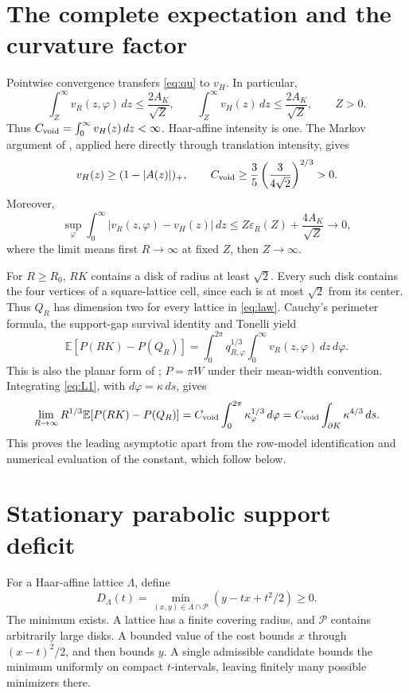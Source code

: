 \documentclass[11pt,a4paper]{article}
\newcommand{\E}{\mathbb E}\newcommand{\Prob}{\mathbb P}
\newcommand{\Pcal}{\mathcal P}\newcommand{\Hrow}{\mathcal H}
\theoremstyle{remark}\newtheorem{remark}{Remark}
\numberwithin{equation}{section}
\begin{document}
\section{The complete expectation and the curvature factor}\label{sec:expectation}
Pointwise convergence transfers \eqref{eq:qu} to $v_H$. In particular,
\begin{equation}\label{eq:tails}
 \int_Z^\infty v_R(z,\varphi)\,dz\le\frac{2A_K}{\sqrt Z},\qquad
 \int_Z^\infty v_H(z)\,dz\le\frac{2A_K}{\sqrt Z},\qquad Z>0.
\end{equation}
Thus $C_{\mathrm{void}}=\int_0^\infty v_H(z)\,dz<\infty$. Haar-affine intensity is one. The Markov argument of \cite[Lemma~3.3]{NR}, applied here directly through translation intensity, gives
\begin{equation}\label{eq:positive}
 v_H(z)\ge(1-|A(z)|)_+,\qquad
 C_{\mathrm{void}}\ge\frac35\left(\frac3{4\sqrt2}\right)^{2/3}>0.
\end{equation}
Moreover,
\begin{equation}\label{eq:L1}
 \sup_\varphi\int_0^\infty|v_R(z,\varphi)-v_H(z)|\,dz
 \le Z\varepsilon_R(Z)+\frac{4A_K}{\sqrt Z}\longrightarrow0,
\end{equation}
where the limit means first $R\to\infty$ at fixed $Z$, then $Z\to\infty$.

For $R\ge R_0$, $RK$ contains a disk of radius at least $\sqrt2$. Every such disk contains the four vertices of a square-lattice cell, since each is at most $\sqrt2$ from its center. Thus $Q_R$ has dimension two for every lattice in \eqref{eq:law}. Cauchy's perimeter formula, the support-gap survival identity and Tonelli yield
\begin{equation}\label{eq:perimeter}
 \E[P(RK)-P(Q_R)]
 =\int_0^{2\pi}q_{R,\varphi}^{1/3}
       \int_0^\infty v_R(z,\varphi)\,dz\,d\varphi.
\end{equation}
This is also the planar form of \cite[Lemma~3.1]{NR}; $P=\pi W$ under their mean-width convention. Integrating \eqref{eq:L1}, with $d\varphi=\kappa\,ds$, gives
\begin{equation}\label{eq:curvature}
 \lim_{R\to\infty}R^{1/3}\E[P(RK)-P(Q_R)]
 =\Cvoid\int_0^{2\pi}\kappa_\varphi^{1/3}\,d\varphi
 =\Cvoid\int_{\partial K}\kappa^{4/3}\,ds.
\end{equation}
This proves the leading asymptotic apart from the row-model identification and numerical evaluation of the constant, which follow below.

\section{Stationary parabolic support deficit}\label{sec:stationary}
For a Haar-affine lattice $\Lambda$, define
\begin{equation}\label{eq:D}
 D_\Lambda(t)=\min_{(x,y)\in\Lambda\cap\Pcal}(y-tx+t^2/2)\ge0.
\end{equation}
The minimum exists. A lattice has a finite covering radius, and $\Pcal$ contains arbitrarily large disks. A bounded value of the cost bounds $x$ through $(x-t)^2/2$, and then bounds $y$. A single admissible candidate bounds the minimum uniformly on compact $t$-intervals, leaving finitely many possible minimizers there.
\end{document}
